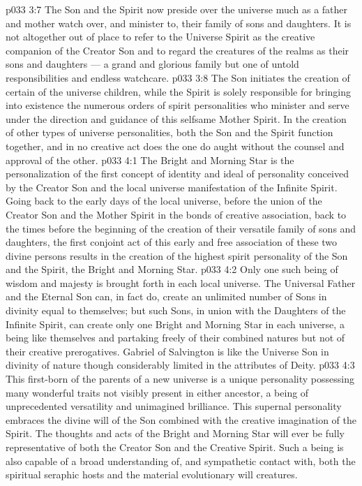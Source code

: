 \vs p033 3:7 The Son and the Spirit now preside over the universe much as a father and mother watch over, and minister to, their family of sons and daughters. It is not altogether out of place to refer to the Universe Spirit as the creative companion of the Creator Son and to regard the creatures of the realms as their sons and daughters --- a grand and glorious family but one of untold responsibilities and endless watchcare.
\vs p033 3:8 \pc The Son initiates the creation of certain of the universe children, while the Spirit is solely responsible for bringing into existence the numerous orders of spirit personalities who minister and serve under the direction and guidance of this selfsame Mother Spirit. In the creation of other types of universe personalities, both the Son and the Spirit function together, and in no creative act does the one do aught without the counsel and approval of the other.
\vs p033 4:1 The Bright and Morning Star is the personalization of the first concept of identity and ideal of personality conceived by the Creator Son and the local universe manifestation of the Infinite Spirit. Going back to the early days of the local universe, before the union of the Creator Son and the Mother Spirit in the bonds of creative association, back to the times before the beginning of the creation of their versatile family of sons and daughters, the first conjoint act of this early and free association of these two divine persons results in the creation of the highest spirit personality of the Son and the Spirit, the Bright and Morning Star.
\vs p033 4:2 Only one such being of wisdom and majesty is brought forth in each local universe. The Universal Father and the Eternal Son can, in fact do, create an unlimited number of Sons in divinity equal to themselves; but such Sons, in union with the Daughters of the Infinite Spirit, can create only one Bright and Morning Star in each universe, a being like themselves and partaking freely of their combined natures but not of their creative prerogatives. Gabriel of Salvington is like the Universe Son in divinity of nature though considerably limited in the attributes of Deity.
\vs p033 4:3 This first\hyp{}born of the parents of a new universe is a unique personality possessing many wonderful traits not visibly present in either ancestor, a being of unprecedented versatility and unimagined brilliance. This supernal personality embraces the divine will of the Son combined with the creative imagination of the Spirit. The thoughts and acts of the Bright and Morning Star will ever be fully representative of both the Creator Son and the Creative Spirit. Such a being is also capable of a broad understanding of, and sympathetic contact with, both the spiritual seraphic hosts and the material evolutionary will creatures.
